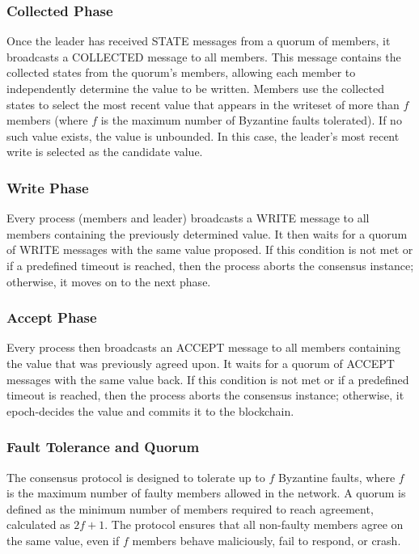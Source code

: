 \documentclass[runningheads]{llncs}
\begin{document}
\subsubsection{Collected Phase}
Once the leader has received STATE messages from a quorum of members, it
broadcasts a COLLECTED message to all members. This message contains the
collected states from the quorum's members, allowing each member to
independently determine the value to be written. Members use the collected
states to select the most recent value that appears in the writeset of more than
\( f \) members (where \( f \) is the maximum number of Byzantine faults
tolerated). If no such value exists, the value is unbounded. In this case, the
leader's most recent write is selected as the candidate value.

\subsubsection{Write Phase}
Every process (members and leader) broadcasts a WRITE message to all members
containing the previously determined value. It then waits for a quorum of WRITE
messages with the same value proposed. If this condition is not met or if a
predefined timeout is reached, then the process aborts the consensus instance;
otherwise, it moves on to the next phase.

\subsubsection{Accept Phase}
Every process then broadcasts an ACCEPT message to all members containing the
value that was previously agreed upon. It waits for a quorum of ACCEPT messages
with the same value back. If this condition is not met or if a predefined
timeout is reached, then the process aborts the consensus instance; otherwise,
it epoch-decides the value and commits it to the blockchain.

\subsubsection{Fault Tolerance and Quorum}
The consensus protocol is designed to tolerate up to \( f \) Byzantine faults,
where \( f \) is the maximum number of faulty members allowed in the network. A
quorum is defined as the minimum number of members required to reach agreement,
calculated as \( 2f+1 \). The protocol ensures that all non-faulty members agree
on the same value, even if \( f \) members behave maliciously, fail to respond,
or crash.
\end{document}
